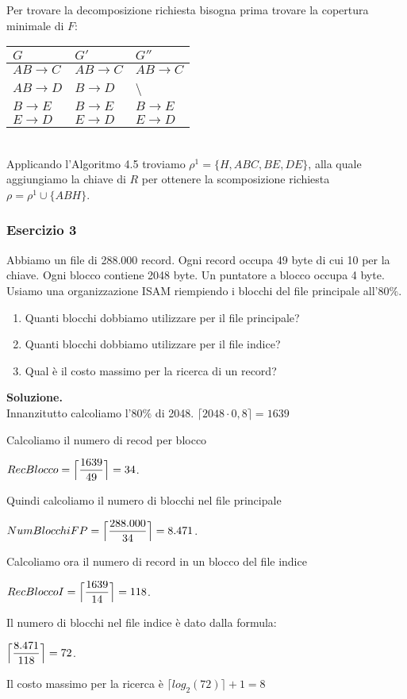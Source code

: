  \noindent Per trovare la decomposizione richiesta bisogna prima trovare la copertura minimale di $F$:\\
 
 \begin{tabular}{l|l|l}
 $G$ & $G'$ & $G''$\\
 \hline
 $AB \rightarrow C$ & $AB \rightarrow C$ & $AB \rightarrow C$\\
 $AB \rightarrow D$ & $B \rightarrow D$ & \textbackslash \\
 $B \rightarrow E$ & $B \rightarrow E$ & $B \rightarrow E$\\
 $E \rightarrow D$ & $E \rightarrow D$ & $E \rightarrow D$\\
 \end{tabular}\\
 
 \noindent Applicando l'Algoritmo 4.5 troviamo $\rho^1= \{H, ABC, BE, DE\}$, alla quale aggiungiamo la chiave di $R$
 per ottenere la scomposizione richiesta $\rho = \rho^1 \cup \{ABH\}$.
 
\subsubsection{Esercizio 3}
Abbiamo un file di 288.000 record. Ogni record occupa 49 byte di cui 10 per la chiave. Ogni blocco contiene 2048 byte.
Un puntatore a blocco occupa 4 byte. Usiamo una organizzazione ISAM riempiendo i blocchi del file principale all'$80\%$.
\begin{enumerate}
 \item  Quanti blocchi dobbiamo utilizzare per il file principale? 
 \item Quanti blocchi dobbiamo utilizzare per il file indice?
 \item Qual è il costo massimo per la ricerca di un record? 
\end{enumerate}

\noindent\textbf{\fontsize{14pt}{1em}Soluzione.}\\
Innanzitutto calcoliamo l'$80\%$ di 2048. $\lceil2048 \cdot 0,8\rceil = 1639$

Calcoliamo il numero di recod per blocco
\begin{center}
 $RecBlocco = \Bigl\lceil \dfrac{1639}{49} \Bigr\rceil = 34$.\\
\end{center}
Quindi calcoliamo il numero di blocchi nel file principale
\begin{center}
 $NumBlocchiFP = \Bigl\lceil \dfrac{288.000}{34} \Bigr\rceil = 8.471$.\\
\end{center}
Calcoliamo ora il numero di record in un blocco del file indice
\begin{center}
 $RecBloccoI = \Bigl\lceil \dfrac{1639}{14} \Bigr\rceil = 118$.\\
\end{center}
Il numero di blocchi nel file indice è dato dalla formula:
\begin{center}
 $\Bigl\lceil \dfrac{8.471}{118} \Bigr\rceil = 72$.
\end{center}
Il costo massimo per la ricerca è $\lceil log_2(72)\rceil + 1 = 8$
  
 





